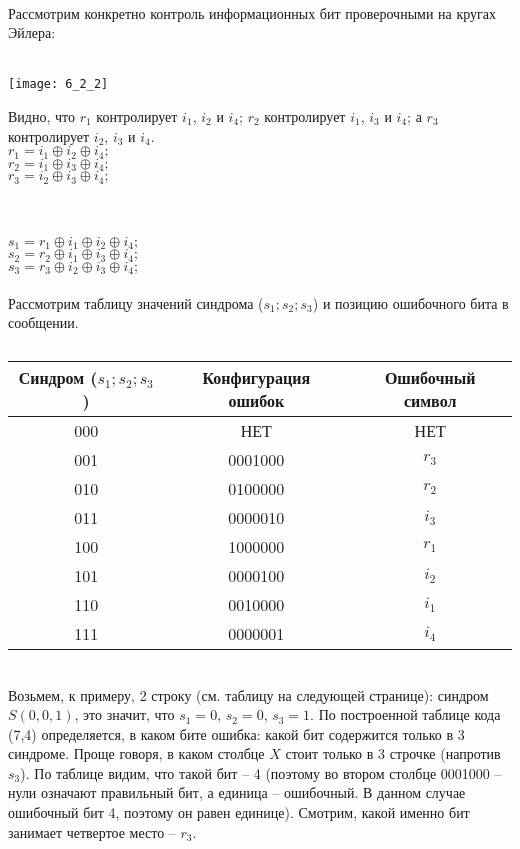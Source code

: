 \\Рассмотрим конкретно контроль информационных бит проверочными на кругах Эйлера:
\\\\
\begin{minipage}[l]{3.5cm}
\texttt{[image: 6\_2\_2]}
\end{minipage}
\begin{minipage}[r]{9cm}
Видно, что $r_1$ контролирует $i_1$, $i_2$ и $i_4$; $r_2$ контролирует $i_1$, $i_3$ и $i_4$; а $r_3$ контролирует $i_2$, $i_3$ и $i_4$.
\\$r_1 = i_1 \oplus i_2 \oplus i_4;$
\\$r_2 = i_1 \oplus i_3 \oplus i_4;$
\\$r_3 = i_2 \oplus i_3 \oplus i_4;$
\end{minipage}
\\
\\$s_1 = r_1 \oplus i_1 \oplus i_2 \oplus i_4;$
\\$s_2 = r_2 \oplus i_1 \oplus i_3 \oplus i_4;$
\\$s_3 = r_3 \oplus i_2 \oplus i_3 \oplus i_4;$
\\
\\Рассмотрим таблицу значений синдрома ($s_1;s_2;s_3$) и позицию ошибочного бита в сообщении.
\begin{table}[h]
\caption{}
\begin{tabular}{|c|c|c|}
\hline
Синдром ($s_1;s_2;s_3$) & Конфигурация ошибок & Ошибочный символ\\
\hline
000 & НЕТ & НЕТ \\
001 & 0001000 & $r_3$ \\
010 & 0100000 & $r_2$ \\
011 & 0000010 & $i_3$ \\
100 & 1000000 & $r_1$ \\
101 & 0000100 & $i_2$ \\
110 & 0010000 & $i_1$ \\
111 & 0000001 & $i_4$ \\
\hline
\end{tabular}
\end{table}\\
Возьмем, к примеру, 2 строку (см. таблицу на следующей странице): синдром $S(0,0,1)$, это значит, что $s_1 = 0$, $s_2 = 0$, $s_3 = 1$. По построенной таблице кода (7,4) определяется, в каком бите ошибка: какой бит содержится только в 3 синдроме. Проще говоря, в каком столбце $X$ стоит только в 3 строчке (напротив $s_3$). По таблице видим, что такой бит -- 4 (поэтому во втором столбце 0001000 -- нули означают правильный бит, а единица -- ошибочный. В данном случае ошибочный бит 4, поэтому он равен единице). Смотрим, какой именно бит занимает четвертое место -- $r_3$.
